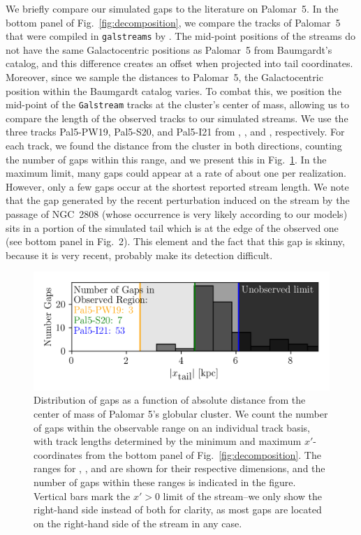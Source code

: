         We briefly compare our simulated gaps to the literature on Palomar~5. In the bottom panel of Fig.~\ref{fig:decomposition}, we compare the tracks of Palomar~5 that were compiled in \texttt{galstreams} by \citet{2023MNRAS.520.5225M}. The mid-point positions of the streams do not have the same Galactocentric positions as Palomar~5 from Baumgardt's catalog, and this difference creates an offset when projected into tail coordinates. Moreover, since we sample the distances to Palomar~5, the Galactocentric position within the Baumgardt catalog varies. To combat this, we position the mid-point of the \texttt{Galstream} tracks at the cluster's center of mass, allowing us to compare the length of the observed tracks to our simulated streams. We use the three tracks Pal5-PW19, Pal5-S20, and Pal5-I21 from \citet{2019AJ....158..223P}, \citet{2020MNRAS.495.2222S}, and \citet{2021ApJ...914..123I}, respectively. For each track, we found the distance from the cluster in both directions, counting the number of gaps within this range, and we present this in Fig.~\ref{fig:GapsWithinSight}. In the maximum limit, many gaps could appear at a rate of about one per realization. However, only a few gaps occur at the shortest reported stream length. We note that the gap generated by the recent perturbation induced on the stream by the passage of NGC~2808 (whose occurrence is very likely according to our models) sits in a portion of the simulated tail which is at the edge of the observed one (see bottom panel in Fig.~2). This element and the fact that this gap is skinny, because it is very recent, probably make its detection difficult. 
        \begin{figure}
            \centering
            \includegraphics[width=\linewidth]{images/GapWithinSight.png}
            \caption[Observability of gaps]{Distribution of gaps as a function of absolute distance from the center of mass of Palomar 5's globular cluster. We count the number of gaps within the observable range on an individual track basis, with track lengths determined by the minimum and maximum $x'$-coordinates from the bottom panel of Fig.~\ref{fig:decomposition}. The ranges for \citet{2019AJ....158..223P}, \citet{2020MNRAS.495.2222S}, and \citet{2021ApJ...914..123I} are shown for their respective dimensions, and the number of gaps within these ranges is indicated in the figure. Vertical bars mark the $x' > 0$ limit of the stream--we only show the right-hand side instead of both for clarity, as most gaps are located on the right-hand side of the stream in any case. }
            \label{fig:GapsWithinSight}
        \end{figure}

